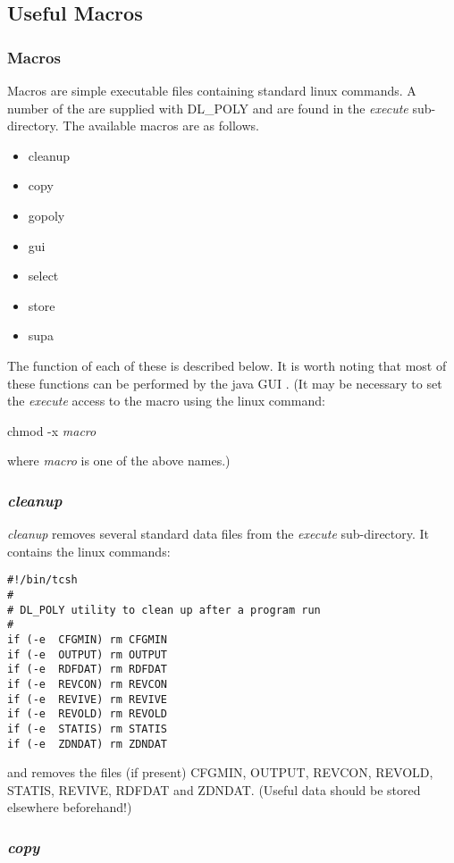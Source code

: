 
\subsection{Useful Macros}
\label{macros}
\subsubsection{Macros}
Macros are simple executable files containing standard linux commands.
A number of the are supplied with DL\_POLY and are found in the
{\em execute} sub-directory. The available macros are as follows.
{\sl
\begin{itemize}
\item cleanup
\item copy
\item gopoly
\item gui
\item select
\item store
\item supa
\end{itemize}
}

The function of each of these is described below. It is worth noting
that most of these functions can be performed by the \D{} java GUI
\cite{smith-gui}. (It may be necessary to set the {\em execute} access
to the macro using the linux command:

\noindent chmod -x {\em macro}

\noindent where {\em macro} is one of the above names.)

\subsubsection{{\sl cleanup}}

{\sl cleanup} removes several standard data files from the {\em
execute} sub-directory. It contains the linux commands:
\begin{verbatim}
#!/bin/tcsh
#
# DL_POLY utility to clean up after a program run
#
if (-e  CFGMIN) rm CFGMIN
if (-e  OUTPUT) rm OUTPUT
if (-e  RDFDAT) rm RDFDAT
if (-e  REVCON) rm REVCON
if (-e  REVIVE) rm REVIVE
if (-e  REVOLD) rm REVOLD
if (-e  STATIS) rm STATIS
if (-e  ZDNDAT) rm ZDNDAT
\end{verbatim}
\noindent and removes the files (if present) CFGMIN, OUTPUT, REVCON, 
REVOLD, STATIS, REVIVE, RDFDAT and ZDNDAT. (Useful data should
be stored elsewhere beforehand!)

\subsubsection{{\sl copy}}

